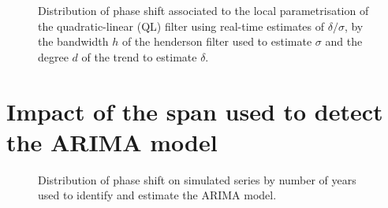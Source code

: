 \documentclass[
]{article}
\newcommand\1{\mathds{1}}
\begin{document}
\begin{figure}

\caption{\label{fig-graphs-ql-deg}Distribution of phase shift associated
to the local parametrisation of the quadratic-linear (QL) filter using
real-time estimates of \(\delta/\sigma\), by the bandwidth \(h\) of the
henderson filter used to estimate \(\sigma\) and the degree \(d\) of the
trend to estimate \(\delta\).}


\end{figure}%

\newpage

\section{Impact of the span used to detect the ARIMA
model}\label{impact-of-the-span-used-to-detect-the-arima-model}

\begin{figure}

\caption{\label{fig-graphs-impact-span}Distribution of phase shift on
simulated series by number of years used to identify and estimate the
ARIMA model.}


\end{figure}%
\end{document}
